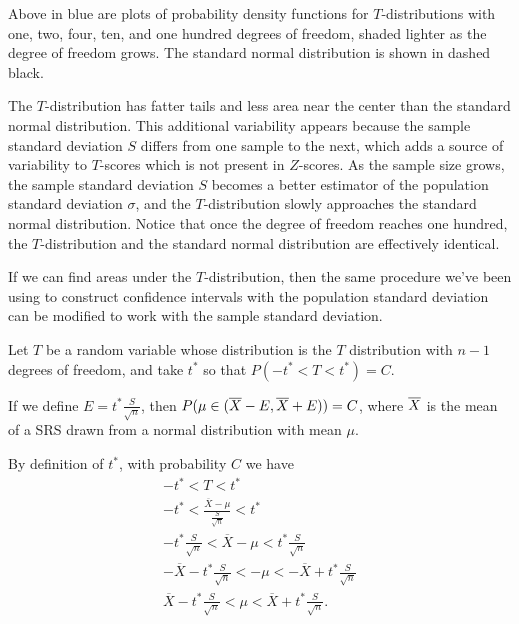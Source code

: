 \par
Above in blue are plots of probability density functions for $T$-distributions with one, two, four, ten, and one hundred degrees of freedom, shaded lighter as the degree of freedom grows. The standard normal distribution is shown in dashed black.
\par 
The $T$-distribution has fatter tails and less area near the center than the standard normal distribution. This additional variability appears because the sample standard deviation $S$ differs from one sample to the next, which adds a source of variability to $T$-scores which is not present in $Z$-scores. As the sample size grows, the sample standard deviation $S$ becomes a better estimator of the population standard deviation $\sigma$, and the $T$-distribution slowly approaches the standard normal distribution. Notice that once the degree of freedom reaches one hundred, the $T$-distribution and the standard normal distribution are effectively identical.
\par
If we can find areas under the $T$-distribution, then the same procedure we've been using to construct confidence intervals with the population standard deviation can be modified to work with the sample standard deviation.
\begin{prop}Let $T$ be a random variable whose distribution is the $T$ distribution with $n-1$ degrees of freedom, and take $t^*$ so that $P(-t^* < T < t^*) = C$.
\par
\noindent If we define $E = t^*\frac{S}{\sqrt{n}}$, then $P(\mu \in ({\overline{X}} - E, {\overline{X}} + E)) = C$, where ${\overline{X}}$ is the mean of a SRS drawn from a normal distribution with mean $\mu$.
\end{prop}
\begin{pf}
By definition of $t^*$, with probability $C$ we have
\begin{gather*}
-t^* < T < t^* \\
-t^* < \textstyle\frac{\overline{X}- \mu}{\frac{S}{\sqrt{n}}} < t^* \\
-t^* \textstyle\frac{S}{\sqrt{n}} < \overline{X}- \mu < t^* \frac{S}{\sqrt{n}} \\[0.2ex]
-\overline{X}-t^* \textstyle\frac{S}{\sqrt{n}} < - \mu < -\overline{X}+t^* \frac{S}{\sqrt{n}} \\[0.3ex]
\overline{X}-t^* \textstyle\frac{S}{\sqrt{n}} <  \mu < \overline{X}+t^* \frac{S}{\sqrt{n}}.
\end{gather*}
\end{pf}
\par
